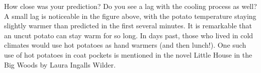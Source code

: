 \documentclass{ximera}
\begin{document}
How close was your prediction?  Do you see a lag with the cooling process as well?  A small lag is noticeable in the figure above, with the potato temperature staying slightly warmer than predicted in the first several minutes.  It is remarkable that an uncut potato can stay warm for so long.  In days past, those who lived in cold climates would use hot potatoes as hand warmers (and then lunch!).  One such use of hot potatoes in coat pockets is mentioned in the novel Little House in the Big Woods by Laura Ingalls Wilder.
\end{document}
